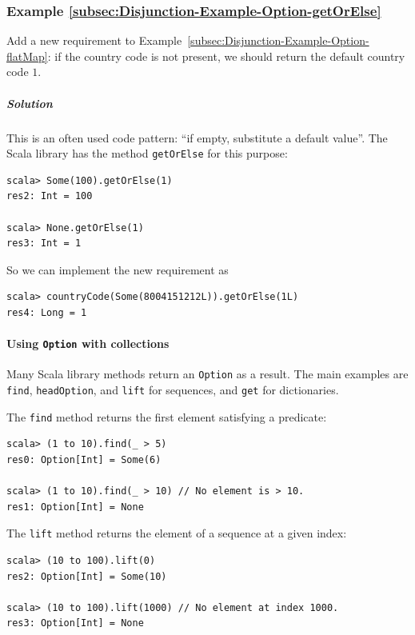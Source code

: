 \subsubsection{Example \label{subsec:Disjunction-Example-Option-getOrElse}\ref{subsec:Disjunction-Example-Option-getOrElse}}

Add a new requirement to Example~\ref{subsec:Disjunction-Example-Option-flatMap}:
if the country code is not present, we should return the default country
code $1$.

\subparagraph{Solution}

This is an often used code pattern: \textsf{``}if empty, substitute a default
value\textsf{''}. The Scala library has the method \lstinline!getOrElse!
for this purpose:
\begin{lstlisting}
scala> Some(100).getOrElse(1)
res2: Int = 100

scala> None.getOrElse(1)
res3: Int = 1
\end{lstlisting}
So we can implement the new requirement as
\begin{lstlisting}
scala> countryCode(Some(8004151212L)).getOrElse(1L)
res4: Long = 1
\end{lstlisting}


\paragraph{Using \texttt{Option} with collections}

Many Scala library methods return an \lstinline!Option! as a result.
The main examples are \lstinline!find!, \lstinline!headOption!,
and \lstinline!lift! for sequences, and \lstinline!get! for dictionaries.

The \lstinline!find! method returns the first element satisfying
a predicate:
\begin{lstlisting}
scala> (1 to 10).find(_ > 5)
res0: Option[Int] = Some(6)

scala> (1 to 10).find(_ > 10) // No element is > 10.
res1: Option[Int] = None
\end{lstlisting}

The \lstinline!lift! method returns the element of a sequence at
a given index:
\begin{lstlisting}
scala> (10 to 100).lift(0)
res2: Option[Int] = Some(10)

scala> (10 to 100).lift(1000) // No element at index 1000.
res3: Option[Int] = None
\end{lstlisting}

